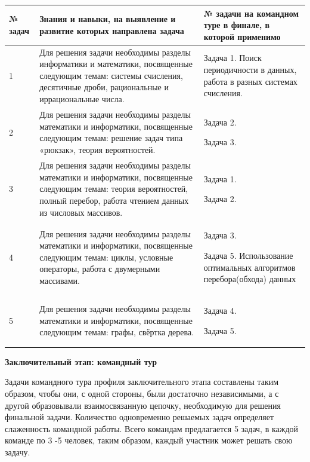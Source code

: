 \begin{center}
\small
\begin{longtable}{|p{2cm}|p{9cm}|p{4cm}|}
\hline
\textbf{№ задач} & \textbf{Знания и навыки, на выявление и развитие которых направлена задача}&\textbf{№ задачи на командном туре в финале, в которой применимо} \\
\hline
1 & Для решения задачи необходимы разделы информатики и математики, посвященные следующим темам: системы счисления, десятичные дроби, рациональные и иррациональные числа.& Задача 1. Поиск периодичности в данных, работа в разных системах счисления.\\
\hline
2& Для решения задачи необходимы разделы математики и информатики, посвященные следующим темам: решение задач типа «рюкзак», теория вероятностей.& Задача 2.

Задача 3.\\
\hline
3& Для решения задачи необходимы разделы математики и информатики, посвященные следующим темам: теория вероятностей, полный перебор, работа чтением данных из числовых массивов. & Задача 1.

Задача 2.\\
\hline
4& Для решения задачи необходимы разделы математики и информатики, посвященные следующим темам: циклы, условные операторы, работа с двумерными массивами.& Задача 3.

Задача 5. Использование оптимальных алгоритмов перебора(обхода) данных \\
\hline
5& Для решения задачи необходимы разделы математики и информатики, посвященные следующим темам: графы, свёртка дерева.& Задача 4.

Задача 5. \\
\hline
\end{longtable}
\end{center}

\textbf{Заключительный этап: командный тур}

Задачи командного тура профиля заключительного этапа составлены таким образом, чтобы они, с одной стороны, были достаточно независимыми, а с другой образовывали взаимосвязанную цепочку, необходимую для решения финальной задачи. Количество одновременно решаемых задач определяет слаженность командной работы. Всего командам предлагается 5 задач, в каждой команде по 3 -5 человек, таким образом, каждый участник может решать свою задачу. 

